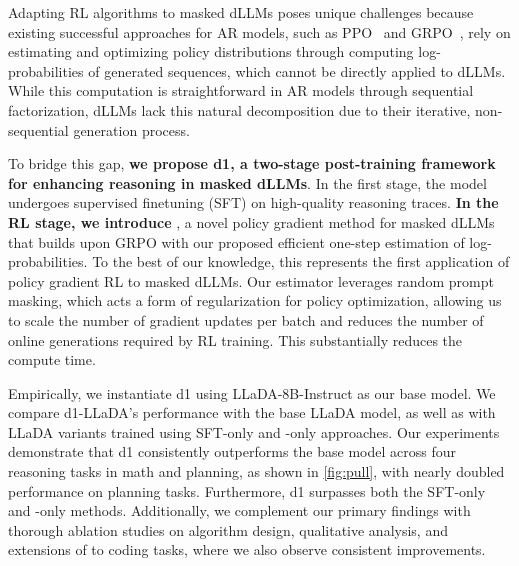 Adapting RL algorithms to masked dLLMs poses  unique challenges because existing successful approaches for AR models, such as PPO~\citep{schulman2017proximal} and GRPO~\citep{shao2024deepseekmath}, rely on estimating and optimizing policy distributions through computing log-probabilities of generated sequences, which cannot be directly applied to dLLMs. While this computation is straightforward in AR models through sequential factorization, dLLMs lack this natural decomposition due to their iterative, non-sequential generation process.

To bridge this gap, \textbf{we propose d1, a two-stage post-training framework for enhancing reasoning in masked dLLMs}. In the first stage, the model undergoes supervised finetuning (SFT) on high-quality reasoning traces. \textbf{In the RL stage, we introduce \grpo{}}, a novel policy gradient method for masked dLLMs that builds upon GRPO with our proposed efficient one-step estimation of log-probabilities. To the best of our knowledge, this represents the first application of policy gradient RL to masked dLLMs. Our estimator leverages random prompt masking, which acts a form of regularization for policy optimization, allowing us to scale the number of gradient updates per batch and reduces the number of online generations required by RL training. This substantially reduces the compute time. 

Empirically, we instantiate d1 using LLaDA-8B-Instruct as our base model. We compare d1-LLaDA's performance with the base LLaDA model, as well as with LLaDA variants trained using SFT-only and \grpo-only approaches. Our experiments demonstrate that d1 consistently outperforms the base model across four reasoning tasks in math and planning, as shown in \cref{fig:pull}, with nearly doubled performance on planning tasks. Furthermore, d1 surpasses both the SFT-only and \grpo-only methods. Additionally, we complement our primary findings with thorough ablation studies on algorithm design, qualitative analysis, and extensions of \grpo{} to coding tasks, where we also observe consistent improvements.
